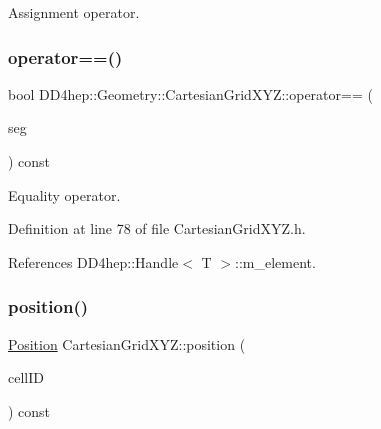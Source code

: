 Assignment operator. 

\hypertarget{class_d_d4hep_1_1_geometry_1_1_cartesian_grid_x_y_z_a9657d5b706869627c2fb51cb442a755f}{}\label{class_d_d4hep_1_1_geometry_1_1_cartesian_grid_x_y_z_a9657d5b706869627c2fb51cb442a755f} 
\subsubsection{\texorpdfstring{operator==()}{operator==()}}
{\footnotesize\ttfamily bool D\+D4hep\+::\+Geometry\+::\+Cartesian\+Grid\+X\+Y\+Z\+::operator== (\begin{DoxyParamCaption}\item[{const \hyperlink{class_d_d4hep_1_1_geometry_1_1_cartesian_grid_x_y_z}{Cartesian\+Grid\+X\+YZ} \&}]{seg }\end{DoxyParamCaption}) const\hspace{0.3cm}{\ttfamily [inline]}}



Equality operator. 



Definition at line 78 of file Cartesian\+Grid\+X\+Y\+Z.\+h.



References D\+D4hep\+::\+Handle$<$ T $>$\+::m\+\_\+element.

\hypertarget{class_d_d4hep_1_1_geometry_1_1_cartesian_grid_x_y_z_a9c26b2fb2035e0f74fb1a52909ff53e2}{}\label{class_d_d4hep_1_1_geometry_1_1_cartesian_grid_x_y_z_a9c26b2fb2035e0f74fb1a52909ff53e2} 
\subsubsection{\texorpdfstring{position()}{position()}}
{\footnotesize\ttfamily \hyperlink{namespace_d_d4hep_1_1_geometry_a55083902099d03506c6db01b80404900}{Position} Cartesian\+Grid\+X\+Y\+Z\+::position (\begin{DoxyParamCaption}\item[{const Cell\+ID \&}]{cell\+ID }\end{DoxyParamCaption}) const}



